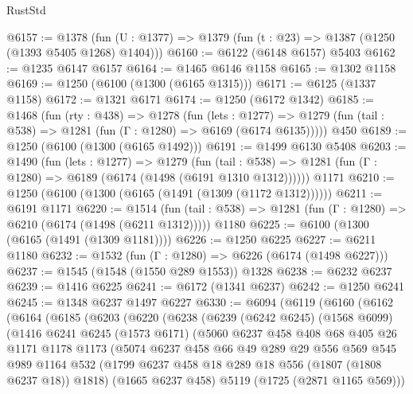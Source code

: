 \begin{lexlean}{RustStd}
\begin{coremodule}
{\begin{coremodule}
{{{{{{{{{{{{{@6157 := @1378 (fun (U : @1377) => @1379 (fun (t : @23) => @1387 (@1250 (@1393 @5405 @1268) @1404)))
@6160 := @6122 (@6148 @6157) @5403
@6162 := @1235 @6147 @6157
@6164 := @1465 @6146 @1158
@6165 := @1302 @1158
@6169 := @1250 (@6100 (@1300 (@6165 @1315)))
@6171 := @6125 (@1337 @1158)
@6172 := @1321 @6171
@6174 := @1250 (@6172 @1342)
@6185 := @1468
    (fun (rty : @438) =>
    @1278
      (fun (lets : @1277) =>
      @1279 (fun (tail : @538) => @1281 (fun (Γ : @1280) => @6169 (@6174 @6135)))))
    @450
@6189 := @1250 (@6100 (@1300 (@6165 @1492)))
@6191 := @1499 @6130 @5408
@6203 := @1490
    (fun (lets : @1277) =>
    @1279
      (fun (tail : @538) => @1281 (fun (Γ : @1280) => @6189 (@6174 (@1498 (@6191 @1310 @1312))))))
    @1171
@6210 := @1250 (@6100 (@1300 (@6165 (@1491 (@1309 (@1172 @1312))))))
@6211 := @6191 @1171
@6220 := @1514
    (fun (tail : @538) => @1281 (fun (Γ : @1280) => @6210 (@6174 (@1498 (@6211 @1312)))))
    @1180
@6225 := @6100 (@1300 (@6165 (@1491 (@1309 @1181))))
@6226 := @1250 @6225
@6227 := @6211 @1180
@6232 := @1532 (fun (Γ : @1280) => @6226 (@6174 (@1498 @6227)))
@6237 := @1545 (@1548 (@1550 @289 @1553)) @1328
@6238 := @6232 @6237
@6239 := @1416 @6225
@6241 := @6172 (@1341 @6237)
@6242 := @1250 @6241
@6245 := @1348 @6237 @1497 @6227
@6330 := @6094
    (@6119
      (@6160
        (@6162
          (@6164
            (@6185
              (@6203
                (@6220
                  (@6238
                    (@6239
                      (@6242 @6245)
                      (@1568 @6099)
                      (@1416
                        @6241
                        @6245
                        (@1573 @6171)
                        (@5060
                          @6237
                          @458
                          @408
                          @68
                          @405
                          @26
                          @1171
                          @1178
                          @1173
                          (@5074
                            @6237
                            @458
                            @66
                            @49
                            @289
                            @29
                            @556
                            @569
                            @545
                            @989
                            @1164
                            @532
                            (@1799 @6237 @458 @18 @289 @18 @556 (@1807 (@1808 @6237 @18)) @1818)
                            (@1665 @6237 @458)
                            @5119
                            (@1725 (@2871 @1165 @569)))
}}}}}}}}}}}}}
\end{coremodule}}
\end{coremodule}
\end{lexlean}
